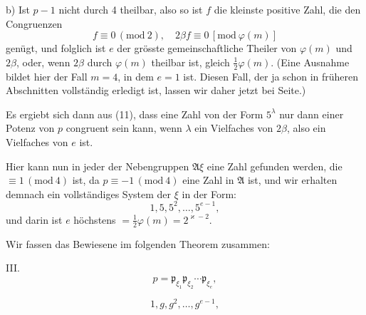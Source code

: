 b) Ist $p-1$ nicht durch 4 theilbar, also
so ist $f$ die kleinste positive Zahl, die den Congruenzen
\[ f \equiv 0 \, (\mathrm{mod}\ 2), \quad 2\beta f \equiv 0 \, [\mathrm{mod}\ \varphi(m)] \]
genügt, und folglich ist $e$ der grösste gemeinschaftliche Theiler von $\varphi(m)$ und $2\beta$, oder, wenn $2\beta$ durch $\varphi(m)$ theilbar ist, gleich $\tfrac{1}{2}\varphi(m)$. (Eine Ausnahme bildet hier der Fall $m=4$, in dem $e=1$ ist. Diesen Fall, der ja schon in früheren Abschnitten vollständig erledigt ist, lassen wir daher jetzt bei Seite.)

Es ergiebt sich dann aus (11), dass eine Zahl von der Form $5^\lambda$ nur dann einer Potenz von $p$ congruent sein kann, wenn $\lambda$ ein Vielfaches von $2\beta$, also ein Vielfaches von $e$ ist.

Hier kann nun in jeder der Nebengruppen $\mathfrak{A}\xi$ eine Zahl gefunden werden, die $\equiv 1 \, (\mathrm{mod}\ 4)$ ist, da $p \equiv -1 \, (\mathrm{mod}\ 4)$ eine Zahl in $\mathfrak{A}$ ist, und wir erhalten demnach ein vollständiges System der $\xi$ in der Form:
\[ 1, 5, 5^2, \ldots, 5^{e-1}, \]
und darin ist $e$ höchstens $= \tfrac{1}{2}\varphi(m) = 2^{\varkappa-2}$.

Wir fassen das Bewiesene im folgenden Theorem zusammen:

III. 
\[ p = \mathfrak{p}_{\xi_1} \mathfrak{p}_{\xi_2} \cdots \mathfrak{p}_{\xi_e}, \]

\[ 1, g, g^2, \ldots, g^{e-1}, \]
